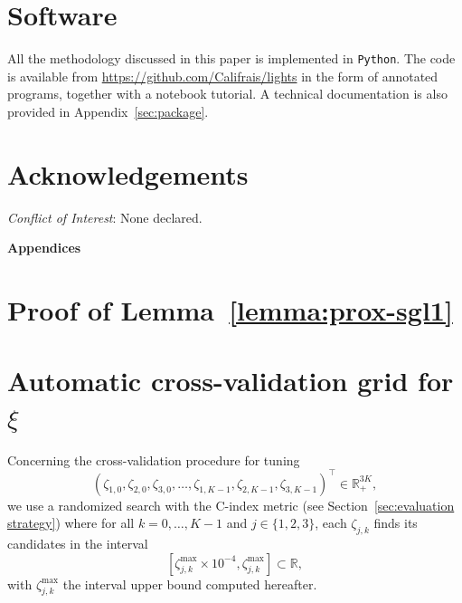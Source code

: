\documentclass[11pt]{article}
\newcommand{\R}{\mathds R}
\begin{document}
\section*{Software}
All the methodology discussed in this paper is implemented in \texttt{Python}. The code is available from \url{https://github.com/Califrais/lights} in the form of annotated programs, together with a notebook tutorial. A technical documentation is also provided in Appendix~\ref{sec:package}.

\section*{Acknowledgements}
\textit{Conflict of Interest}: None declared.

\appendix

\begin{center}
\LARGE \textbf{Appendices}
\end{center}

\section{Proof of Lemma~\ref{lemma:prox-sgl1}}
\label{sec:proof-lemma-prox-sgl1}



\section{Automatic cross-validation grid for $\xi$}
\label{sec:auto-grid-cv}

Concerning the cross-validation procedure for tuning 
\[(\zeta_{1,0}, \zeta_{2,0}, \zeta_{3,0}, \ldots, \zeta_{1,K-1}, \zeta_{2,K-1}, \zeta_{3,K-1})^\top \in \R_+^{3K}, \]
we use a randomized search with the C-index metric (see Section~\ref{sec:evaluation strategy}) where for all $k=0, \ldots, K-1$ and $j \in \{1, 2, 3\}$, each $\zeta_{j,k}$ finds its candidates in the interval 
\[[\zeta_{j,k}^{\text{max}} \times 10^{-4}, \zeta_{j,k}^{\text{max}} ] \subset \R, \]
with $\zeta_{j,k}^{\text{max}}$ the interval upper bound computed hereafter.
\end{document}
